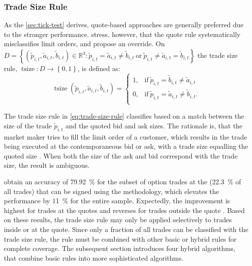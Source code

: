 \subsubsection{Trade Size Rule}\label{sec:trade-size-rule}

As the \cref{sec:tick-test} derives, quote-based approaches are generally preferred due to the stronger performance. \textcite[][13]{grauerOptionTradeClassification2022} stress, however, that the quote rule systematically misclassifies limit orders, and propose an override. On $D = \left\{(\tilde{p}_{i, t} , \tilde{a}_{i, t} , \tilde{b}_{i,t}) \in \mathbb{R}^3: \tilde{p}_{i,t} = \tilde{a}_{i,t} \neq \tilde{b}_{i,t} \ \text{or} \ \tilde{p}_{i,t} \neq  \tilde{a}_{i,t} = \tilde{b}_{i,t} \right\}$ the trade size rule, $\operatorname{tsize} \colon D \to \left\{0,1\right\}$, is defined as:
\begin{equation}
  \operatorname{tsize}(\tilde{p}_{i, t} , \tilde{a}_{i, t} , \tilde{b}_{i,t})=
  \begin{cases}
    1, & \text{if}\ \tilde{p}_{i, t} = \tilde{b}_{i, t} \neq \tilde{a}_{i, t}  \\
    0, & \text{if}\ \tilde{p}_{i, t} = \tilde{a}_{i, t} \neq \tilde{b}_{i, t}. \\
  \end{cases}
  \label{eq:trade-size-rule}
\end{equation}

The trade size rule in \cref{eq:trade-size-rule} classifies based on a match between the size of the trade $\tilde{p}_{i, t}$ and the quoted bid and ask sizes. The rationale is, that the market maker tries to fill the limit order of a customer, which results in the trade being executed at the contemporaneous bid or ask, with a trade size equalling the quoted size \autocite[][13]{grauerOptionTradeClassification2022}. When both the size of the ask and bid correspond with the trade size, the result is ambiguous.

\textcite[][13]{grauerOptionTradeClassification2022} obtain an accuracy of \SI{79.92}{\percent} for the subset of option trades at the   (\SI{22.3}{\percent} of all trades) that can be signed using the methodology, which elevates the performance by \SI{11}{\percent} for the entire sample. Expectedly, the improvement is highest for trades at the quotes and reverses for trades outside the quote \autocite[][15]{grauerOptionTradeClassification2022}. Based on these results, the trade size rule may only be applied selectively to trades inside or at the quote. Since only a fraction of all trades can be classified with the trade size rule, the rule must be combined with other basic or hybrid rules for complete coverage. The subsequent section introduces four hybrid algorithms, that combine basic rules into more sophisticated algorithms.

